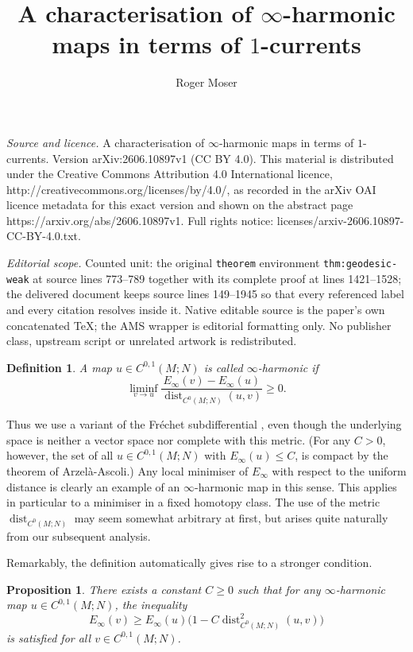 \documentclass[10pt,a4paper]{amsart}
\DeclareMathOperator{\dist}{dist}
\newtheorem{proposition}[theorem]{Proposition}
\newtheorem{definition}[theorem]{Definition}
\begin{document}
\title[A characterisation of infty-harmonic maps in terms of 1-curr]{A characterisation of $\infty$-harmonic maps in terms of $1$-currents}
\author{Roger Moser}
\date{}
\maketitle
\noindent\emph{Source and licence.} A characterisation of $\infty$-harmonic maps in terms of $1$-currents. Version arXiv:2606.10897v1 (CC BY 4.0). This material is distributed under the Creative Commons Attribution 4.0 International licence, http://creativecommons.org/licenses/by/4.0/, as recorded in the arXiv OAI licence metadata for this exact version and shown on the abstract page https://arxiv.org/abs/2606.10897v1. Full rights notice: licenses/arxiv-2606.10897-CC-BY-4.0.txt.\par\smallskip
\noindent\textit{Editorial scope.} Counted unit: the original \texttt{theorem} environment \texttt{thm:geodesic-weak} at source lines 773--789 together with its complete proof at lines 1421--1528; the delivered document keeps source lines 149--1945 so that every referenced label and every citation resolves inside it. Native editable source is the paper's own concatenated TeX; the AMS wrapper is editorial formatting only. No publisher class, upstream script or unrelated artwork is redistributed.
\begin{definition} \label{def:infinity-harmonic}
A map $u \in C^{0, 1}(M; N)$ is called \emph{$\infty$-harmonic} if
\[
\liminf_{v \to u} \frac{E_\infty(v) - E_\infty(u)}{\dist_{C^0(M; N)}(u, v)} \ge 0.
\]
\end{definition}

Thus we use a variant of the Fr\'echet subdifferential \cite{Kruger:03},
even though the underlying space is neither a vector space nor complete with this metric.
(For any $C > 0$, however, the set of all $u \in C^{0, 1}(M; N)$ with $E_\infty(u) \le C$, is
compact by the theorem of Arzel\`a-Ascoli.)
Any local minimiser of $E_\infty$ with respect to the uniform
distance is clearly an example of an $\infty$-harmonic map in this sense.
This applies in particular to a minimiser in a fixed homotopy class.
The use of the metric $\dist_{C^0(M; N)}$ may seem somewhat
arbitrary at first, but arises quite naturally from our subsequent analysis.

Remarkably, the definition automatically gives rise to a stronger condition.

\begin{proposition} \label{prp:energy-discrepancy}
There exists a constant $C \ge 0$ such that for any $\infty$-harmonic map $u \in C^{0, 1}(M; N)$,
the inequality
\[
E_\infty(v) \ge E_\infty(u) \bigl(1 - C \dist_{C^0(M; N)}^2(u, v)\bigr)
\]
is satisfied for all $v \in C^{0, 1}(M; N)$.
\end{proposition}
\end{document}
